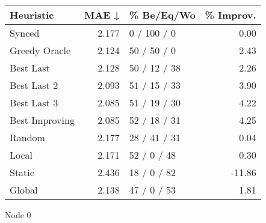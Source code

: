\begin{tabular}{lrlr}
\toprule
\textbf{Heuristic} & \textbf{MAE ↓} & \textbf{\% Be/Eq/Wo} & \textbf{\% Improv.} \\
\midrule
            Synced &          2.177 &          0 / 100 / 0 &                0.00 \\
     Greedy Oracle &          2.124 &          50 / 50 / 0 &                2.43 \\
         Best Last &          2.128 &         50 / 12 / 38 &                2.26 \\
       Best Last 2 &          2.093 &         51 / 15 / 33 &                3.90 \\
       Best Last 3 &          2.085 &         51 / 19 / 30 &                4.22 \\
    Best Improving &          2.085 &         52 / 18 / 31 &                4.25 \\
            Random &          2.177 &         28 / 41 / 31 &                0.04 \\
             Local &          2.171 &          52 / 0 / 48 &                0.30 \\
            Static &          2.436 &          18 / 0 / 82 &              -11.86 \\
            Global &          2.138 &          47 / 0 / 53 &                1.81 \\
\bottomrule
\end{tabular}
\caption{Node 0}
\label{tab:ds_iid_lr05_le1_bs4_0}
